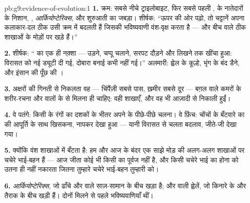 \begin{solution}{pb:g9:evidence-of-evolution:1}
\textbf{1.} क्रम: सबसे नीचे ट्राइलोबाइट, फिर सबसे पहली , 
के नातेदारों के निशान, , \emph{आर्कियोप्टेरिक्स}, और शुरुआती
 का जबड़ा। शीर्षक: ``ऊपर की ओर पढ़ो, तो चट्टानें अपना कलाकार-दल
ठीक उसी क्रम में बदलती हैं जिसकी भविष्यवाणी वंश-वृक्ष करता है --- और बीच
वाले ठीक शाखाओं के मोड़ों पर खड़े हैं।''

\textbf{2.} शीर्षक: `` का एक ही नक़्शा --- उड़ने, चप्पू चलाने,
सरपट दौड़ने और लिखने तक खींचा हुआ: विरासत को नई ड्यूटी दी गई, दोबारा
बनाई कभी नहीं गई।'' अलमारी: ह्वेल के कूल्हे, भृंग के बंद डैने, और इंसान
की पूँछ की ।

\textbf{3.} अक्षरों की गिनती से निकलता वह  --- चिंपैंज़ी सबसे पास,
ख़मीर सबसे दूर --- बग़ल वाले कमरों के शरीर-रचना और  वालों के 
से मिलना ही चाहिए: वही शाखाएँ, और वह भी आज़ादी से निकाली हुईं।

\textbf{4.} वे पतंगे: किसी  के रंगों का दशकों के भीतर अपने
 के पीछे-पीछे चलना। वे फ़िंच: चोंचों के बँटवारे का  की
आपूर्ति के साथ खिसकना, नापकर देखा हुआ --- यानी विरासत से चलता बदलाव,
जीते-जी देखा गया।

\textbf{5.} क्योंकि वंश शाखाओं में बँटता है: हम और आज के बंदर एक साझे
मोड़ की अलग-अलग शाखाओं पर चचेरे भाई-बहन हैं --- आज जीता कोई भी किसी का
पूर्वज नहीं है, और किसी चचेरे भाई का होना  को उतना ही नहीं
नकारता जितना तुम्हारे चचेरे भाई-बहन तुम्हारी  को।

\textbf{6.} \emph{आर्कियोप्टेरिक्स}, जो  ढाँचे और  वाले
साज़-सामान के बीच खड़ा है; और  वाली  ह्वेलें, जो किनारे के
 और तैराक के बीच खड़ी हैं। दोनों मिलने से पहले भविष्यवाणियाँ थीं।


\end{solution}
